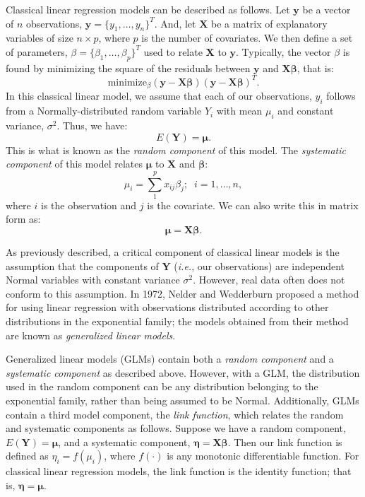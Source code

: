 Classical linear regression models can be described as follows.  Let $\mathbf{y}$ be a vector of $n$ observations, $\mathbf{y} = \{y_1, \ldots , y_n\}^T$.  And, let $\mathbf{X}$ be a matrix of explanatory variables of size $n \times p$, where $p$ is the number of covariates.  We then define a set of parameters, $\beta = \{\beta_1, \ldots , \beta_p\}^T$ used to relate $\mathbf{X}$ to $\mathbf{y}$.  Typically, the vector $\beta$ is found by minimizing the square of the residuals between $\mathbf{y}$ and $\mathbf{X\beta}$, that is:
%
\begin{equation}
\mathrm{minimize}_\beta (\mathbf{y}-\mathbf{X}\bm{\beta})(\mathbf{y}-\mathbf{X}\bm{\beta})^T.
\end{equation}
%
In this classical linear model, we assume that each of our observations, $y_i$ follows from a Normally-distributed random variable $Y_i$ with mean $\mu_i$ and constant variance, $\sigma^2$.  Thus, we have:
%
\begin{equation}
E(\mathbf{Y}) = \bm{\mu}.
\end{equation}
%
This is what is known as the \emph{random component} of this model.  The \emph{systematic component} of this model relates $\bm{\mu}$ to $\mathbf{X}$ and $\bm{\beta}$:
%
\begin{equation}
\mu_i = \sum\limits_1^p{x_{ij}}\beta_j; \;\;    i = 1,\ldots, n,
\end{equation}
%
where $i$ is the observation and $j$ is the covariate. We can also write this in matrix form as:
%
\begin{equation}
\bm{\mu} = \mathbf{X}\bm{\beta}.
\end{equation}

As previously described, a critical component of classical linear models is the assumption that the components of $\mathbf{Y}$ (\emph{i.e.}, our observations) are independent Normal variables with constant variance $\sigma^2$.  However, real data often does not conform to this assumption.  In 1972, Nelder and Wedderburn \cite{Nelder1972} proposed a method for using linear regression with observations distributed according to other distributions in the exponential family; the models obtained from their method are known as \emph{generalized linear models}.

Generalized linear models (GLMs) contain both a \emph{random component} and a \emph{systematic component} as described above.  However, with a GLM, the distribution used in the random component can be any distribution belonging to the exponential family, rather than being assumed to be Normal.  Additionally, GLMs contain a third model component, the \emph{link function}, which relates the random and systematic components as follows.  Suppose we have a random component, $E(\mathbf{Y}) = \bm{\mu}$, and a systematic component, $\bm{\eta} = \mathbf{X}\bm{\beta}$.  Then our link function is defined as $\eta_i =f(\mu_i)$, where $f(\cdot)$ is any monotonic differentiable function.  For classical linear regression models, the link function is the identity function; that is, $\bm{\eta} = \bm{\mu}$.

